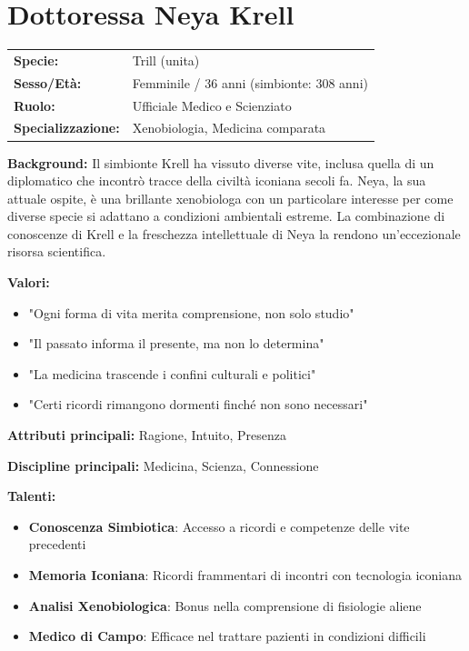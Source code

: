 \documentclass[11pt,a4paper]{article}
\begin{document}
\section{Dottoressa Neya Krell}

\begin{tcolorbox}[colback=fedlightblue!10, colframe=fedblue]
\begin{tabularx}{\textwidth}{lX}
\textbf{Specie:} & Trill (unita) \\
\textbf{Sesso/Età:} & Femminile / 36 anni (simbionte: 308 anni) \\
\textbf{Ruolo:} & Ufficiale Medico e Scienziato \\
\textbf{Specializzazione:} & Xenobiologia, Medicina comparata \\
\end{tabularx}

\textbf{Background:} Il simbionte Krell ha vissuto diverse vite, inclusa quella di un diplomatico che incontrò tracce della civiltà iconiana secoli fa. Neya, la sua attuale ospite, è una brillante xenobiologa con un particolare interesse per come diverse specie si adattano a condizioni ambientali estreme. La combinazione di conoscenze di Krell e la freschezza intellettuale di Neya la rendono un'eccezionale risorsa scientifica.

\textbf{Valori:}
\begin{itemize}[leftmargin=*]
\item "Ogni forma di vita merita comprensione, non solo studio"
\item "Il passato informa il presente, ma non lo determina"
\item "La medicina trascende i confini culturali e politici"
\item "Certi ricordi rimangono dormenti finché non sono necessari"
\end{itemize}

\textbf{Attributi principali:} Ragione, Intuito, Presenza

\textbf{Discipline principali:} Medicina, Scienza, Connessione

\textbf{Talenti:}
\begin{itemize}[leftmargin=*]
\item \textbf{Conoscenza Simbiotica}: Accesso a ricordi e competenze delle vite precedenti
\item \textbf{Memoria Iconiana}: Ricordi frammentari di incontri con tecnologia iconiana
\item \textbf{Analisi Xenobiologica}: Bonus nella comprensione di fisiologie aliene
\item \textbf{Medico di Campo}: Efficace nel trattare pazienti in condizioni difficili
\end{itemize}
\end{tcolorbox}
\end{document}
